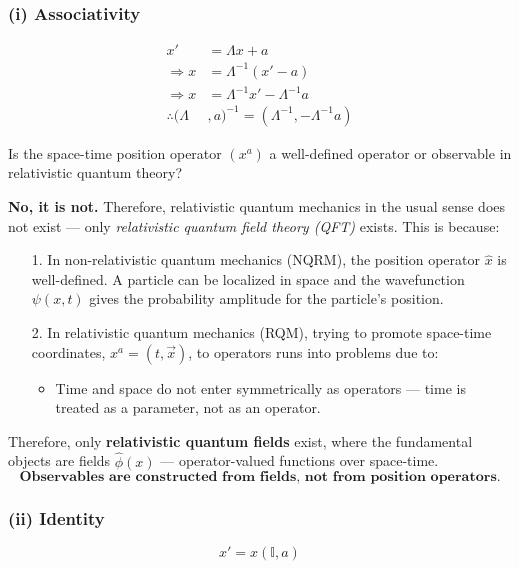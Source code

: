 \documentclass[14pt]{article} %
\begin{document}
\subsubsection*{(i) Associativity}
\vspace{-0.7cm}
\begin{align*}
    x' &= \Lambda x + a \\
    \Rightarrow x &= \Lambda^{-1} (x' - a) \\
    \Rightarrow x &= \Lambda^{-1} x' -  \Lambda^{-1}a \\
    \therefore (\Lambda&, a)^{-1} = (\Lambda^{-1}, -\Lambda^{-1}a) \tag{4.1} \label{eq:4.1}
\end{align*}
\begin{tcolorbox}[ title=\textbf{Note:}]

Is the space-time position operator $(x^a)$ a well-defined operator or observable in relativistic quantum theory? 

\medskip

\noindent \textbf{No, it is not.} Therefore, relativistic quantum mechanics in the usual sense does not exist — only \textit{relativistic quantum field theory (QFT)} exists. This is because:

\begin{itemize}
    \item [1.] In non-relativistic quantum mechanics (NQRM), the position operator $\hat{x}$ is well-defined. A particle can be localized in space and the wavefunction $\psi(x,t)$ gives the probability amplitude for the particle's position.
    
    \item [2.] In relativistic quantum mechanics (RQM), trying to promote space-time coordinates, $x^a = (t, \vec{x})$, to operators runs into problems due to:    
    \begin{itemize}
        \item Time and space do not enter symmetrically as operators — time is treated as a parameter, not as an operator.
    \end{itemize}
\end{itemize}

\noindent Therefore, only \textbf{relativistic quantum fields} exist, where the fundamental objects are fields $\hat{\phi}(x)$ — operator-valued functions over space-time.
$$\textbf{Observables are constructed from fields, not from position operators.}$$
\end{tcolorbox}

\subsubsection*{(ii) Identity}
\vspace{-0.7cm}
\[
x' = x(\mathbb{I},a)
\]
\end{document}
